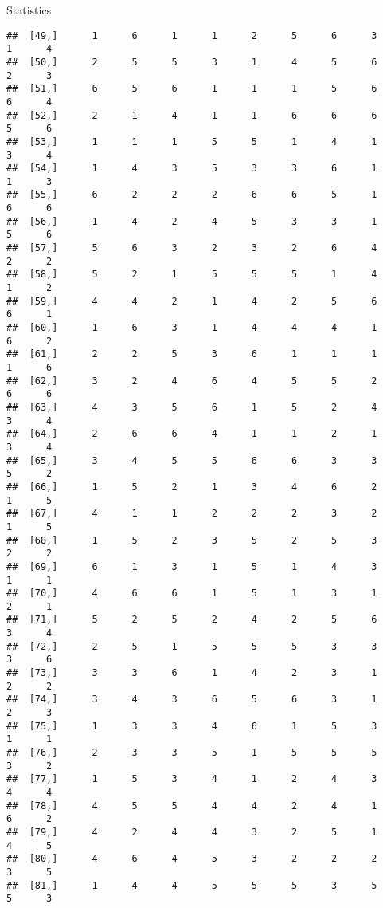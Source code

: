 \documentclass[
  ignorenonframetext,
]{beamer}
\begin{document}
\begin{frame}[fragile]{Statistics}
\begin{verbatim}
##  [49,]      1      6      1      1      2      5      6      3      1      4
##  [50,]      2      5      5      3      1      4      5      6      2      3
##  [51,]      6      5      6      1      1      1      5      6      6      4
##  [52,]      2      1      4      1      1      6      6      6      5      6
##  [53,]      1      1      1      5      5      1      4      1      3      4
##  [54,]      1      4      3      5      3      3      6      1      1      3
##  [55,]      6      2      2      2      6      6      5      1      6      6
##  [56,]      1      4      2      4      5      3      3      1      5      6
##  [57,]      5      6      3      2      3      2      6      4      2      2
##  [58,]      5      2      1      5      5      5      1      4      1      2
##  [59,]      4      4      2      1      4      2      5      6      6      1
##  [60,]      1      6      3      1      4      4      4      1      6      2
##  [61,]      2      2      5      3      6      1      1      1      1      6
##  [62,]      3      2      4      6      4      5      5      2      6      6
##  [63,]      4      3      5      6      1      5      2      4      3      4
##  [64,]      2      6      6      4      1      1      2      1      3      4
##  [65,]      3      4      5      5      6      6      3      3      5      2
##  [66,]      1      5      2      1      3      4      6      2      1      5
##  [67,]      4      1      1      2      2      2      3      2      1      5
##  [68,]      1      5      2      3      5      2      5      3      2      2
##  [69,]      6      1      3      1      5      1      4      3      1      1
##  [70,]      4      6      6      1      5      1      3      1      2      1
##  [71,]      5      2      5      2      4      2      5      6      3      4
##  [72,]      2      5      1      5      5      5      3      3      3      6
##  [73,]      3      3      6      1      4      2      3      1      2      2
##  [74,]      3      4      3      6      5      6      3      1      2      3
##  [75,]      1      3      3      4      6      1      5      3      1      1
##  [76,]      2      3      3      5      1      5      5      5      3      2
##  [77,]      1      5      3      4      1      2      4      3      4      4
##  [78,]      4      5      5      4      4      2      4      1      6      2
##  [79,]      4      2      4      4      3      2      5      1      4      5
##  [80,]      4      6      4      5      3      2      2      2      3      5
##  [81,]      1      4      4      5      5      5      3      5      5      3

\end{verbatim}
\end{frame}
\end{document}
